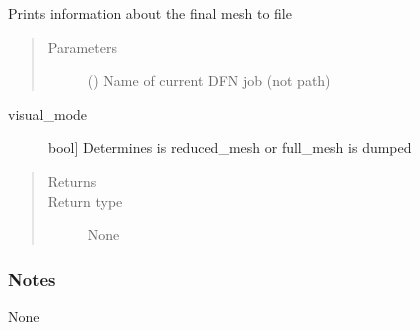 \documentclass[letterpaper,10pt,english]{sphinxmanual}
\begin{document}
\begin{fulllineitems}
\label{\detokenize{pydfnworks:pydfnworks.dfnGen.mesh_dfn_helper.output_meshing_report}}
Prints information about the final mesh to file
\begin{quote}\begin{description}
\item[{Parameters}] \leavevmode
{} () \textendash{} Name of current DFN job (not path)

\end{description}\end{quote}
\begin{description}
\item[{visual\_mode}] \leavevmode{[}bool{]}
Determines is reduced\_mesh or full\_mesh is dumped

\end{description}
\begin{quote}\begin{description}
\item[{Returns}] \leavevmode


\item[{Return type}] \leavevmode
None

\end{description}\end{quote}
\subsubsection*{Notes}

None

\end{fulllineitems}

\end{document}
